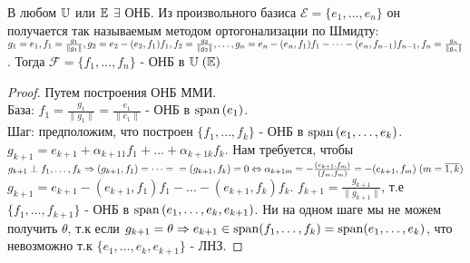 \documentclass[../main.tex]{subfiles}
\begin{document}
\newpage
{}
\begin{theorem}
    В любом $\U$ или $\E$ $\exists $ ОНБ. Из произвольного базиса $\mathcal{E}=\{e_{1},\dots,e_{n}\}$ он получается так называемым методом ортогонализации по Шмидту: $g_{1}=e_{1}, f_{1}= \frac{g_{1}}{\|g_{1}\|},\\ g_{2}=e_{2} - (e_{2},f_{1})f_{1}, f_{2} = \frac{g_{2}}{\|g_{2}\|},\dots,g_{n} = e_{n} - (e_{n},f_{1})f_{1}-\dots-(e_{n},f_{n-1})f_{n-1}, f_{n} = \frac{g_{n}}{\|g_{n}\|}$. Тогда $\mathcal{F}=\{f_{1},\dots,f_{n}\}$ - ОНБ в $\U\;(\E)$
\end{theorem}
\begin{proof}
    Путем построения ОНБ ММИ. 
    \\База: $f_{1} = \frac{g_{1}}{\|g_{1}\|} = \frac{e_{1}}{\|e_{1}\|}$ - ОНБ в $\spann{(e_{1})}$. 
    \\Шаг: предположим, что построен $\{f_{1},\dots,f_{k}\} $ - ОНБ в $\spann{(e_{1},\dots,e_{k})}$.
    \\$g_{k+1} = e_{k+1} + \alpha_{k+1 1}f_{1} + \dots + \alpha_{k+1 k}f_{k}$. Нам требуется, чтобы $g_{k+1} \perp f_{1},\dots,f_{k} \implies (g_{k+1},f_{1})= \dots =\\= (g_{k+1},f_{k})=0 \Leftrightarrow \alpha_{k+1 m} = - \frac{(e_{k+1},f_{m})}{(f_{m},f_{m})}  = -(e_{k+1},f_{m})\; (m=\overline{1,k})$ 
    \\$g_{k+1} = e_{k+1} - (e_{k+1},f_{1})f_{1} - \dots - (e_{k+1},f_{k})f_{k}$. $f_{k+1} = \frac{g_{k+1}}{\|g_{k+1}\|}$, т.е $\{ f_{1},\dots,f_{k+1}\}$ - ОНБ в $\spann{(e_{1},\dots,e_{k},e_{k+1})}$. Ни на одном шаге мы не можем получить $\theta$, т.к если $g_{k+1}= \theta \implies e_{k+1} \in \spann(f_{1},\dots,f_{k}) = \spann(e_{1},\dots,e_{k})$, что невозможно т.к $\{e_{1},\dots,e_{k},e_{k+1}\}$ - ЛНЗ. 
\end{proof}
\end{document}
